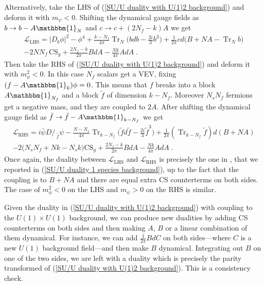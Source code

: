 \documentclass[a4paper, 12pt]{article}
\numberwithin{equation}{section}
\newcommand{\Dslash}{D\!\!\!\!\slash\,}
\newcommand{\cL}{\mathcal{L}}
\newcommand{\unit}{\mathbbm{1}}
\DeclareMathOperator{\Tr}{Tr}
\begin{document}
Alternatively, take the LHS of (\ref{SU/U duality with U(1)2 background}) and deform it with $m_\psi<0$. Shifting the dynamical gauge fields as $b \to b - A \unit_N$ and $c \to c + (2N_f-k)A$ we get
\begin{multline}
\cL_\text{LHS} = |D_b\phi|^2 - \phi^4 + \frac{k-N_f}{4\pi} \Tr_N \Big( bdb- \frac{2i}3 b^3 \Big) + \frac1{2\pi} cd\big( B+NA - \Tr_N b \big) \\
-2NN_f\, \text{CS}_g + \frac{2N_f - k}{2\pi} BdA - \frac{Nk}{4\pi} AdA \;.
\end{multline}
Then take the RHS of (\ref{SU/U duality with U(1)2 background}) and deform it with $m_\phi^2<0$. In this case $N_f$ scalars get a VEV, fixing $(f - A \unit_k)\phi = 0$. This means that $f$ breaks into a block $A \unit_{N_f}$ and a block $\tilde f$ of dimension $k-N_f$. Moreover $N_s N_f$ fermions get a negative mass, and they are coupled to $2A$. After shifting the dynamical gauge field as $\tilde f \to \tilde f - A\unit_{k-N_f}$ we get
\begin{multline}
\cL_\text{RHS} = i \bar\psi \Dslash_{\tilde f} \psi - \frac{N-N_s}{4\pi} \Tr_{k-N_f} \Big( \tilde fd\tilde f - \frac{2i}3 \tilde f^3 \Big) + \frac1{2\pi} (\Tr_{k-N_f} \tilde f) d(B + N A) \\
-2 \big( N_sN_f+Nk-N_sk\big) \text{CS}_g + \frac{2N_f - k}{2\pi} BdA - \frac{Nk}{4\pi} AdA \;.
\end{multline}
Once again, the duality between $\cL_\text{LHS}$ and $\cL_\text{RHS}$ is precisely the one in \cite{Hsin:2016blu}, that we reported in (\ref{SU/U duality 1 species background}), up to the fact that the coupling is to $B+NA$ and there are equal extra CS counterterms on both sides. The case of $m_\phi^2<0$ on the LHS and $m_\psi>0$ on the RHS is similar.

Given the duality in (\ref{SU/U duality with U(1)2 background}) with coupling to the $U(1) \times U(1)$ background, we can produce new dualities by adding CS counterterms on both sides and then making $A$, $B$ or a linear combination of them dynamical. For instance, we can add $\frac1{2\pi} BdC$ on both sides---where $C$ is a new $U(1)$ background field---and then make $B$ dynamical. Integrating out $B$ on one of the two sides, we are left with a duality which is precisely the parity transformed of (\ref{SU/U duality with U(1)2 background}). This is a consistency check.
\end{document}
